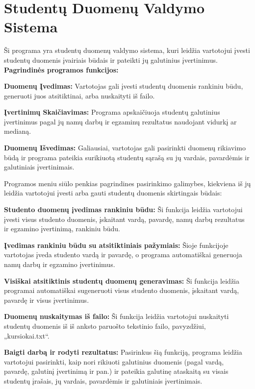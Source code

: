 \chapter{Studentų Duomenų Valdymo Sistema}
\hypertarget{md__r_e_a_d_m_e}{}\label{md__r_e_a_d_m_e}
\label{md__r_e_a_d_m_e_autotoc_md0}%
%
 Ši programa yra studentų duomenų valdymo sistema, kuri leidžia vartotojui įvesti studentų duomenis įvairiais būdais ir pateikti jų galutinius įvertinimus. {\bfseries{Pagrindinės programos funkcijos\+:}}


\begin{DoxyEnumerate}
\item {\bfseries{Duomenų Įvedimas\+:}} Vartotojas gali įvesti studentų duomenis rankiniu būdu, generuoti juos atsitiktinai, arba nuskaityti iš failo.
\item {\bfseries{Įvertinimų Skaičiavimas\+:}} Programa apskaičiuoja studentų galutinius įvertinimus pagal jų namų darbų ir egzaminų rezultatus naudojant vidurkį ar medianą.
\item {\bfseries{Duomenų Išvedimas\+:}} Galiausiai, vartotojas gali pasirinkti duomenų rikiavimo būdą ir programa pateikia surikiuotą studentų sąrašą su jų vardais, pavardėmis ir galutiniais įvertinimais.
\end{DoxyEnumerate}



Programos meniu siūlo penkias pagrindines pasirinkimo galimybes, kiekviena iš jų leidžia vartotojui įvesti arba gauti studentų duomenis skirtingais būdais\+:


\begin{DoxyEnumerate}
\item {\bfseries{Studento duomenų įvedimas rankiniu būdu\+:}} Ši funkcija leidžia vartotojui įvesti visus studento duomenis, įskaitant vardą, pavardę, namų darbų rezultatus ir egzamino įvertinimą, rankiniu būdu.
\item {\bfseries{Įvedimas rankiniu būdu su atsitiktiniais pažymiais\+:}} Šioje funkcijoje vartotojas įveda studento vardą ir pavardę, o programa automatiškai generuoja namų darbų ir egzamino įvertinimus.
\item {\bfseries{Visiškai atsitiktinis studentų duomenų generavimas\+:}} Ši funkcija leidžia programai automatiškai sugeneruoti visus studento duomenis, įskaitant vardą, pavardę ir visus įvertinimus.
\item {\bfseries{Duomenų nuskaitymas iš failo\+:}} Ši funkcija leidžia vartotojui nuskaityti studentų duomenis iš iš anksto paruošto tekstinio failo, pavyzdžiui, „kursiokai.\+txt“.
\item {\bfseries{Baigti darbą ir rodyti rezultatus\+:}} Pasirinkus šią funkciją, programa leidžia vartotojui pasirinkti, kaip nori rikiuoti galutinius duomenis (pagal vardą, pavardę, galutinį įvertinimą ir pan.) ir pateikia galutinę ataskaitą su visais studentų įrašais, jų vardais, pavardėmis ir galutiniais įvertinimais.
\end{DoxyEnumerate}

